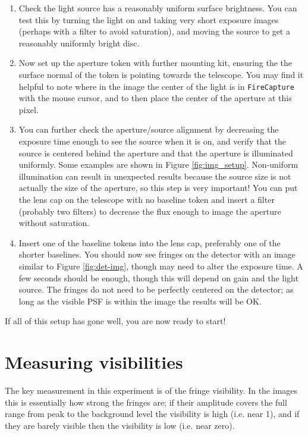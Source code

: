 \documentclass[11pt]{article}
\begin{document}
\begin{enumerate}
    \item Check the light source has a reasonably uniform surface brightness. You can test this by turning the light on and taking very short exposure images (perhaps with a filter to avoid saturation), and moving the source to get a reasonably uniformly bright disc.
    \item Now set up the aperture token with further mounting kit, ensuring the the surface normal of the token is pointing towards the telescope. You may find it helpful to note where in the image the center of the light is in \texttt{FireCapture} with the mouse cursor, and to then place the center of the aperture at this pixel.
    \item You can further check the aperture/source alignment by decreasing the exposure time enough to see the source when it is on, and verify that the source is centered behind the aperture and that the aperture is illuminated uniformly. Some examples are shown in Figure \ref{fig:img_setup}. Non-uniform illumination can result in unexpected results because the source size is not actually the size of the aperture, so this step is very important! You can  put the lens cap on the telescope with no baseline token and insert a filter (probably two filters) to decrease the flux enough to image the aperture without saturation.
    \item Insert one of the baseline tokens into the lens cap, preferably one of the shorter baselines. You should now see fringes on the detector with an image similar to Figure \ref{fig:det-img}, though may need to alter the exposure time. A few seconds should be enough, though this will depend on gain and the light source. The fringes do not need to be perfectly centered on the detector; as long as the visible PSF is within the image the results will be OK.
\end{enumerate}

If all of this setup has gone well, you are now ready to start!

\clearpage
\section{Measuring visibilities}\label{sec:meas}

The key measurement in this experiment is of the fringe visibility. In the images this is essentially how strong the fringes are; if their amplitude covers the full range from peak to the background level the visibility is high (i.e. near 1), and if they are barely visible then the visibility is low (i.e. near zero).
\end{document}
